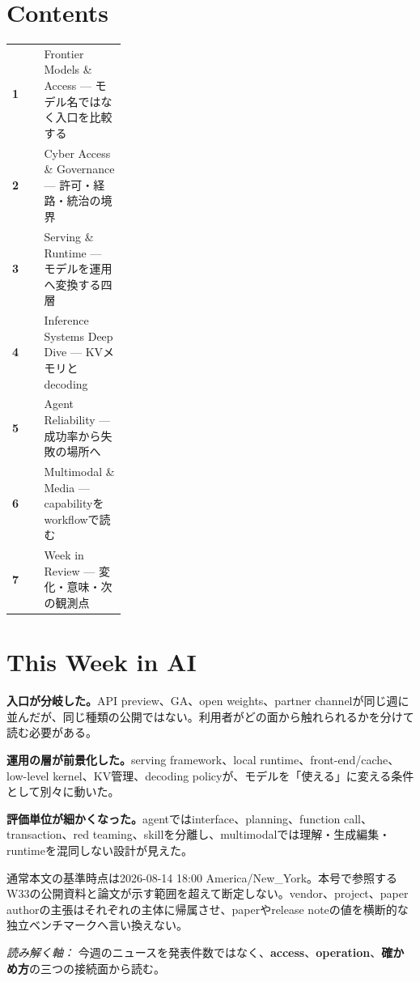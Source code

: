 \section*{Contents}
\begin{tabularx}{0.98\linewidth}{@{}>{\bfseries}p{0.28\linewidth}X@{}}
  1 & Frontier Models \& Access --- モデル名ではなく入口を比較する \\
  2 & Cyber Access \& Governance --- 許可・経路・統治の境界 \\
  3 & Serving \& Runtime --- モデルを運用へ変換する四層 \\
  4 & Inference Systems Deep Dive --- KVメモリとdecoding \\
  5 & Agent Reliability --- 成功率から失敗の場所へ \\
  6 & Multimodal \& Media --- capabilityをworkflowで読む \\
  7 & Week in Review --- 変化・意味・次の観測点 \\
\end{tabularx}

\vspace{4mm}
\section*{This Week in AI}

\begin{tcolorbox}[enhanced,colback=SurveySoft,colframe=SurveyRule,boxrule=0.4pt,arc=1mm,left=3mm,right=3mm,top=2mm,bottom=2mm]
\textbf{入口が分岐した。}\quad API preview、GA、open weights、partner channelが同じ週に並んだが、同じ種類の公開ではない。利用者がどの面から触れられるかを分けて読む必要がある。
\end{tcolorbox}

\begin{tcolorbox}[enhanced,colback=SurveySoft,colframe=SurveyRule,boxrule=0.4pt,arc=1mm,left=3mm,right=3mm,top=2mm,bottom=2mm]
\textbf{運用の層が前景化した。}\quad serving framework、local runtime、front-end/cache、low-level kernel、KV管理、decoding policyが、モデルを「使える」に変える条件として別々に動いた。
\end{tcolorbox}

\begin{tcolorbox}[enhanced,colback=SurveySoft,colframe=SurveyRule,boxrule=0.4pt,arc=1mm,left=3mm,right=3mm,top=2mm,bottom=2mm]
\textbf{評価単位が細かくなった。}\quad agentではinterface、planning、function call、transaction、red teaming、skillを分離し、multimodalでは理解・生成編集・runtimeを混同しない設計が見えた。
\end{tcolorbox}

\vspace{2mm}
\begin{claimboundary}[この号の読み方]
通常本文の基準時点は2026-08-14 18:00 America/New\_York。本号で参照するW33の公開資料と論文が示す範囲を超えて断定しない。vendor、project、paper authorの主張はそれぞれの主体に帰属させ、paperやrelease noteの値を横断的な独立ベンチマークへ言い換えない。
\end{claimboundary}

\vspace{2mm}
\noindent\textit{読み解く軸：} 今週のニュースを発表件数ではなく、\textbf{access}、\textbf{operation}、\textbf{確かめ方}の三つの接続面から読む。
